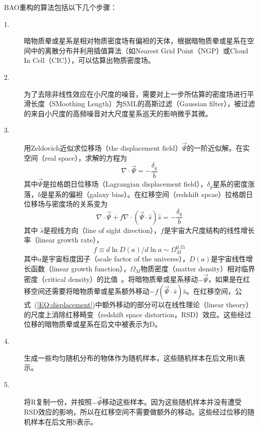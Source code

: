 BAO重构的算法包括以下几个步骤：
\begin{description}
\item[1.] 暗物质晕或星系是相对物质密度场有偏袒的天体，根据暗物质晕或星系在空间中的离散分布并利用插值算法（如Nearest Grid Point（NGP）或Cloud In Cell（CIC）），可以估算出物质密度场。
\item[2.] 为了去除非线性效应在小尺度的噪音，需要对上一步所估算的密度场进行平滑长度（SMoothing Length）为SML的高斯过滤（Gaussian filter），被过滤的来自小尺度的高频噪音对大尺度星系巡天的影响微乎其微。
\item[3.] 用Zeldovich近似求位移场（the displacement field）$\vec{\Psi}$的一阶近似解。在实空间（real space），求解的方程为
\begin{equation} \label{EQ:psireal}
\nabla \cdot \vec{\Psi}=-\frac{\delta_g}{b}
\end{equation}
其中$\vec{\Psi}$是拉格朗日位移场（Lagrangian displacement field），$\delta_{g}$星系的密度涨落，$b$是星系的偏袒（galaxy bias）。在红移空间（redshift spcae）拉格朗日位移场与密度场的关系变为
\begin{equation} \label{EQ:displacement}
\nabla \cdot \vec{\Psi}+f \nabla \cdot (\vec{\Psi} \cdot \hat{s}) \hat{s}=-\frac{\delta_g}{b}
\end{equation}
其中
$\hat{s}$是视线方向（line of sight direction），$f$是宇宙大尺度结构的线性增长率（linear growth rate），
\begin{equation}
f \equiv d \ln D(a)/d \ln a \sim\! \Omega_{M}^{0.55}
\end{equation}
其中$a$是宇宙标度因子（scale factor of the universe），$D(a)$是宇宙线性增长函数（linear growth function），$\Omega_{M}$物质密度（matter density）相对临界密度（critical density）的比值~\cite{Carroll1992,Linder2005}。将暗物质晕或星系移动$-\vec{\Psi}$，如果是在红移空间还需要将暗物质晕或星系额外移动$-f (\vec{\Psi} \cdot \hat{s}) \hat{s}$。在红移空间，公式~(\ref{EQ:displacement})中额外移动的部分可以在线性理论（linear theory）的尺度上消除红移畸变（redshift space distortion，RSD）效应。这些经过位移的暗物质晕或星系在后文中被表示为D。
\item[4.] 生成一些均匀随机分布的物体作为随机样本，这些随机样本在后文用R表示。
\item[5.] 将R复制一份，并按照$-\vec{\Psi}$移动这些样本。因为这些随机样本并没有遭受RSD效应的影响，所以在红移空间不需要做额外的移动。这些经过位移的随机样本在后文用S表示。
\end{description}

